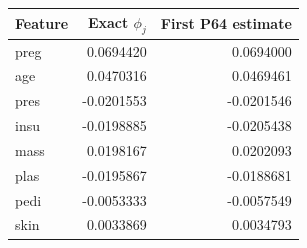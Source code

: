 \begin{tabular}{lrr}
\toprule
Feature & Exact $\phi_j$ & First P64 estimate \\
\midrule
preg & 0.0694420 & 0.0694000 \\
age & 0.0470316 & 0.0469461 \\
pres & -0.0201553 & -0.0201546 \\
insu & -0.0198885 & -0.0205438 \\
mass & 0.0198167 & 0.0202093 \\
plas & -0.0195867 & -0.0188681 \\
pedi & -0.0053333 & -0.0057549 \\
skin & 0.0033869 & 0.0034793 \\
\bottomrule
\end{tabular}
